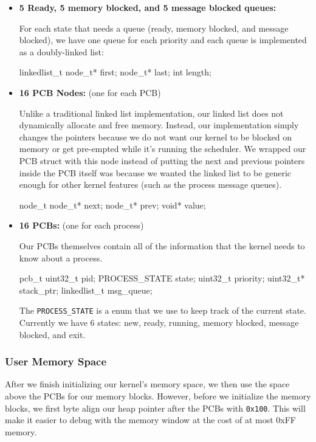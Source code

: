 \documentclass[12pt]{article}
\begin{document}
\begin{itemize}
	\item \textbf{5 Ready, 5 memory blocked, and 5 message blocked queues:} 
	
	For each state that needs a queue (ready, memory blocked, and message blocked), we have one queue for each priority and each queue is implemented as a doubly-linked list:
	\begin{code}
linkedlist_t
    node_t* first;
    node_t* last;
    int length;
	\end{code}
	
	\item \textbf{16 PCB Nodes:} (one for each PCB)
	
	Unlike a traditional linked list implementation, our linked list does not dynamically allocate and free memory. Instead, our implementation simply changes the pointers because we do not want our kernel to be blocked on memory or get pre-empted while it's running the scheduler. We wrapped our PCB struct with this node instead of putting the next and previous pointers inside the PCB itself was because we wanted the linked list to be generic enough for other kernel features (such as the process message queues).
	\begin{code}
node_t
    node_t* next;
    node_t* prev;
    void* value;
	\end{code}
	
	\item \textbf{16 PCBs:} (one for each process)
	
	Our PCBs themselves contain all of the information that the kernel needs to know about a process.
	\begin{code}
pcb_t
    uint32_t pid;
    PROCESS_STATE state;
    uint32_t priority;
    uint32_t* stack_ptr;
    linkedlist_t msg_queue;
	\end{code}
	
	The \texttt{PROCESS\_STATE} is a enum that we use to keep track of the current state. Currently we have 6 states: new, ready, running, memory blocked, message blocked, and exit. 
	
\end{itemize}

\subsubsection{User Memory Space}
After we finish initializing our kernel's memory space, we then use the space above the PCBs for our memory blocks. However, before we initialize the memory blocks, we first byte align our heap pointer after the PCBs with \texttt{0x100}. This will make it easier to debug with the memory window at the cost of at most 0xFF memory.
\end{document}
